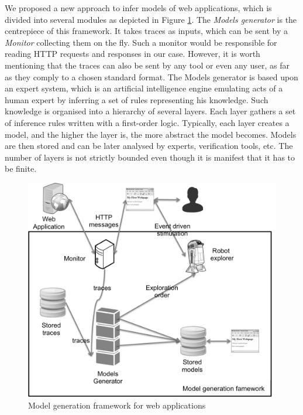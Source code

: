 We proposed a new approach to infer models of web applications,
which is divided into several modules as depicted in Figure
\ref{fig:soict-framework}. The \emph{Models generator} is the
centrepiece of this framework. It takes traces as inputs, which
can be sent by a \emph{Monitor} collecting them on the fly. Such
a monitor would be responsible for reading HTTP requests and
responses in our case. However, it is worth mentioning that the
traces can also be sent by any tool or even any user, as far as
they comply to a chosen standard format. The Models generator is
based upon an expert system, which is an artificial intelligence
engine emulating acts of a human expert by inferring a set of
rules representing his knowledge. Such knowledge is organised
into a hierarchy of several layers. Each layer gathers a set of
inference rules written with a first-order logic. Typically, each
layer creates a model, and the higher the layer is, the more
abstract the model becomes. Models are then stored and can be
later analysed by experts, verification tools, etc. The number of
layers is not strictly bounded even though it is manifest that it
has to be finite.

\begin{figure}[ht]
    \begin{center}
        \includegraphics[width=0.8\linewidth]{figures/soict-framework.png}
    \end{center}
    \caption{Model generation framework for web applications}

    \label{fig:soict-framework}
\end{figure}


